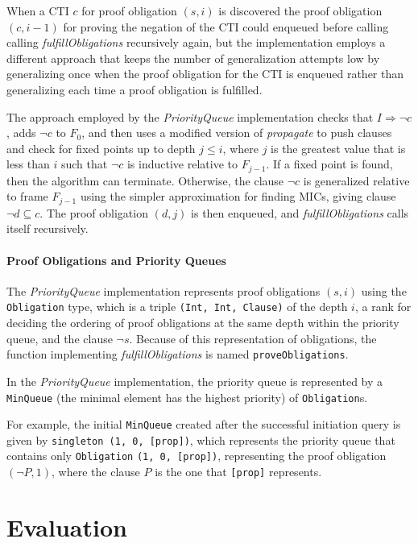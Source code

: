 \documentclass[12pt,a4paper,twoside,openright]{report}
\begin{document}
{When a CTI $c$ for proof obligation $(s,i)$ is discovered the proof obligation $(c,i - 1)$
for proving the negation of the CTI could enqueued before calling
calling {\it fulfillObligations} recursively again,
but the implementation employs a different approach that keeps the number of
generalization attempts low by generalizing once when the proof obligation
for the CTI is enqueued rather than generalizing each time a proof obligation
is fulfilled.

The approach employed by the {\it PriorityQueue} implementation checks
that $I \Rightarrow \neg c$, adds $\neg c$ to $F_0$, and then uses a modified
version of {\it propagate} to push clauses and check for fixed points up to
depth $j \leq i$, where $j$ is the greatest value that is less than $i$
such that $\neg c$ is inductive relative to $F_{j - 1}$. If a fixed point is
found, then the algorithm can terminate. Otherwise, the clause
$\neg c$ is generalized relative to frame $F_{j - 1}$
using the simpler approximation for finding MICs, giving clause
$\neg d \subseteq c$. The proof obligation $(d,j)$ is then enqueued, and
{\it fulfillObligations} calls itself recursively.

\subsubsection{Proof Obligations and Priority Queues}

The {\it PriorityQueue} implementation represents proof obligations $(s,i)$ using the
\verb,Obligation, type, which is a triple \verb.(Int, Int, Clause). of the depth $i$, a
rank for deciding the ordering of proof obligations at the same depth within the priority
queue, and the clause $\neg s$. Because of this representation of obligations, the
function implementing {\it fulfillObligations} is named \verb,proveObligations,.

In the \emph{PriorityQueue} implementation, the priority queue is represented by
a \verb,MinQueue, (the minimal element has the highest
priority) of \verb,Obligation,s.

For example, the initial \verb,MinQueue, created after the successful initiation query
is given by \verb.singleton (1, 0, [prop])., which represents the priority queue that
contains only \verb,Obligation, \verb.(1, 0, [prop])., representing the proof obligation
$(\neg P,1)$, where the clause $P$ is the one that \verb,[prop], represents.

\chapter{Evaluation}

}
\end{document}
